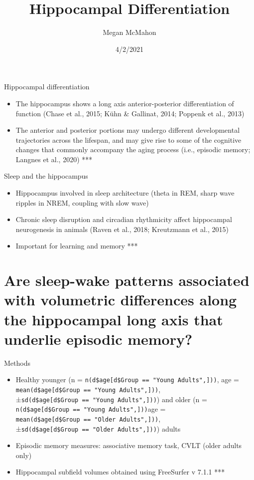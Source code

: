 \documentclass[
  ignorenonframetext,
]{beamer}
\title{Hippocampal Differentiation}
\author{Megan McMahon}
\date{4/2/2021}
\providecommand{\tightlist}{%
  \setlength{\itemsep}{0pt}\setlength{\parskip}{0pt}}
\begin{document}
\frame{\titlepage}

\begin{frame}{Hippocampal differentiation}
\protect\hypertarget{hippocampal-differentiation}{}
\begin{itemize}
\tightlist
\item
  The hippocampus shows a long axis anterior-posterior differentiation
  of function (Chase et al., 2015; Kühn \& Gallinat, 2014; Poppenk et
  al., 2013)
\item
  The anterior and posterior portions may undergo different
  developmental trajectories across the lifespan, and may give rise to
  some of the cognitive changes that commonly accompany the aging
  process (i.e., episodic memory; Langnes et al., 2020) ***
\end{itemize}
\end{frame}

\begin{frame}{Sleep and the hippocampus}
\protect\hypertarget{sleep-and-the-hippocampus}{}
\begin{itemize}
\tightlist
\item
  Hippocampus involved in sleep architecture (theta in REM, sharp wave
  ripples in NREM, coupling with slow wave)
\item
  Chronic sleep disruption and circadian rhythmicity affect hippocampal
  neurogenesis in animals (Raven et al., 2018; Kreutzmann et al., 2015)
\item
  Important for learning and memory ***
\end{itemize}
\end{frame}

\hypertarget{are-sleep-wake-patterns-associated-with-volumetric-differences-along-the-hippocampal-long-axis-that-underlie-episodic-memory}{%
\section{Are sleep-wake patterns associated with volumetric differences
along the hippocampal long axis that underlie episodic
memory?}\label{are-sleep-wake-patterns-associated-with-volumetric-differences-along-the-hippocampal-long-axis-that-underlie-episodic-memory}}

\begin{frame}[fragile]{Methods}
\protect\hypertarget{methods}{}
\begin{itemize}
\tightlist
\item
  Healthy younger (n =
  \texttt{n(d\$age{[}d\$Group\ ==\ "Young\ Adults",{]}))}, age =
  \texttt{mean(d\$age{[}d\$Group\ ==\ "Young\ Adults",{]}))},
  ±\texttt{sd(d\$age{[}d\$Group\ ==\ "Young\ Adults",{]}))}) and older
  (n = \texttt{n(d\$age{[}d\$Group\ ==\ "Young\ Adults",{]}))}age =
  \texttt{mean(d\$age{[}d\$Group\ ==\ "Older\ Adults",{]}))},
  ±\texttt{sd(d\$age{[}d\$Group\ ==\ "Older\ Adults",{]}))}) adults
\item
  Episodic memory measures: associative memory task, CVLT (older adults
  only)
\item
  Hippocampal subfield volumes obtained using FreeSurfer v 7.1.1 ***
  \href{assocmemtask.png}{}
\end{itemize}
\end{frame}
\end{document}
